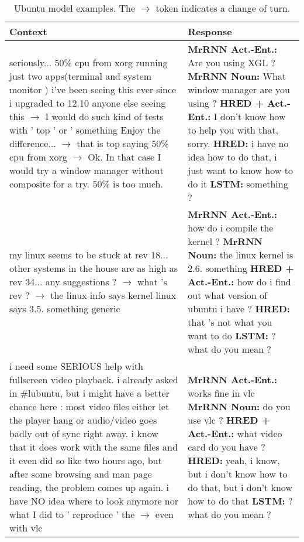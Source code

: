 \documentclass{article}
\begin{document}
\begin{table}[ht]
 \caption{Ubuntu model examples. The $\rightarrow$ token indicates a change of turn.}
 \label{table:ubuntu-examples-first}
 \scriptsize
 \centering
 \begin{tabular}{p{65mm}|p{60mm}}
 \textbf{Context} & \textbf{Response} \\ \hline
seriously... 50\% cpu from xorg running just two apps(terminal and system monitor ) i've been seeing this ever since i upgraded to 12.10 anyone else seeing this $\rightarrow$ I would do such kind of tests with ' top ' or ' something Enjoy the difference... $\rightarrow$ that is top saying 50\% cpu from xorg $\rightarrow$ Ok. In that case I would try a window manager without composite for a try. 50\% is too much. & \textbf{MrRNN Act.\@ -Ent.\@:} Are you using XGL ? \newline \textbf{MrRNN Noun:} What window manager are you using ? \newline \textbf{HRED + Act.\@-Ent.\@:} I don't know how to help you with that, sorry. \newline \textbf{HRED:} i have no idea how to do that, i just want to know how to do it \newline \textbf{LSTM:} something ? \\ \hline 
        my linux seems to be stuck at rev 18... other systems in the house are as high as rev 34... any suggestions ? $\rightarrow$ what 's rev ? $\rightarrow$ the linux info says kernel linux says 3.5. something generic & \textbf{MrRNN Act.\@ -Ent.\@:} how do i compile the kernel ? \newline \textbf{MrRNN Noun:} the linux kernel is 2.6. something \newline \textbf{HRED + Act.\@-Ent.\@:} how do i find out what version of ubuntu i have ? \newline \textbf{HRED:} that 's not what you want to do \newline \textbf{LSTM:} ? what do you mean ? \\ \hline 
        i need some SERIOUS help with fullscreen video playback. i already asked in \#lubuntu, but i might have a better chance here : most video files either let the player hang or audio/video goes badly out of sync right away. i know that it does work with the same files and it even did so like two hours ago, but after some browsing and man page reading, the problem comes up again. i have NO idea where to look anymore nor what I did to ' reproduce ' the $\rightarrow$ even with vlc & \textbf{MrRNN Act.\@ -Ent.\@:} works fine in vlc \newline \textbf{MrRNN Noun:} do you use vlc ? \newline \textbf{HRED + Act.\@-Ent.\@:} what video card do you have ? \newline \textbf{HRED:} yeah, i know, but i don't know how to do that, but i don't know how to do that \newline \textbf{LSTM:} ? what do you mean ? \\ \hline 

\end{tabular}
\end{table}
\end{document}
